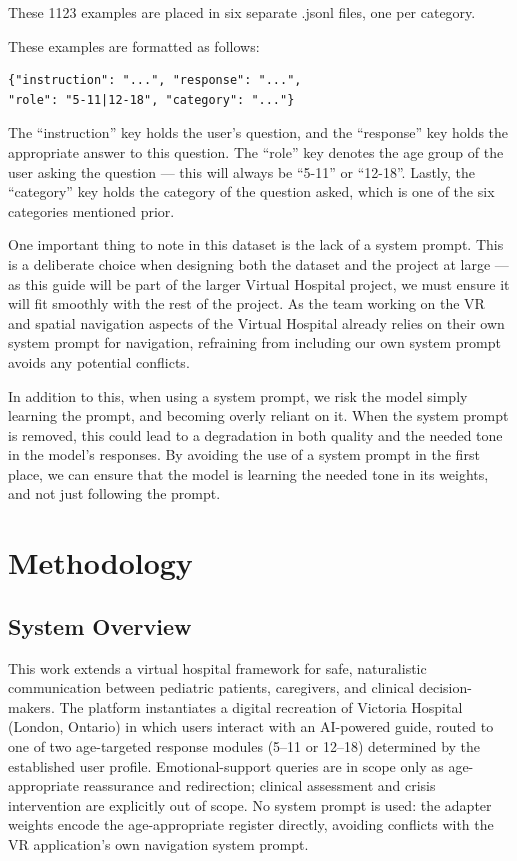 \documentclass[AMA,Times1COL]{WileyNJDv5} %
\begin{document}
These 1123 examples are placed in six separate .jsonl files, one per category.

These examples are formatted as follows:

\begin{verbatim}
{"instruction": "...", "response": "...",
"role": "5-11|12-18", "category": "..."}
\end{verbatim}

The ``instruction'' key holds the user's question, and the ``response'' key holds the appropriate answer to this question. The ``role'' key denotes the age group of the user asking the question --- this will always be ``5-11'' or ``12-18''. Lastly, the ``category'' key holds the category of the question asked, which is one of the six categories mentioned prior.

One important thing to note in this dataset is the lack of a system prompt. This is a deliberate choice when designing both the dataset and the project at large --- as this guide will be part of the larger Virtual Hospital project, we must ensure it will fit smoothly with the rest of the project. As the team working on the VR and spatial navigation aspects of the Virtual Hospital already relies on their own system prompt for navigation, refraining from including our own system prompt avoids any potential conflicts.

In addition to this, when using a system prompt, we risk the model simply learning the prompt, and becoming overly reliant on it. When the system prompt is removed, this could lead to a degradation in both quality and the needed tone in the model's responses. By avoiding the use of a system prompt in the first place, we can ensure that the model is learning the needed tone in its weights, and not just following the prompt.

\section{Methodology}\label{sec:methodology}

\subsection{System Overview}

This work extends a virtual hospital framework for safe, naturalistic communication between pediatric patients, caregivers, and clinical decision-makers. The platform instantiates a digital recreation of Victoria Hospital (London, Ontario) in which users interact with an AI-powered guide, routed to one of two age-targeted response modules (5--11 or 12--18) determined by the established user profile. Emotional-support queries are in scope only as age-appropriate reassurance and redirection; clinical assessment and crisis intervention are explicitly out of scope. No system prompt is used: the adapter weights encode the age-appropriate register directly, avoiding conflicts with the VR application's own navigation system prompt.
\end{document}
